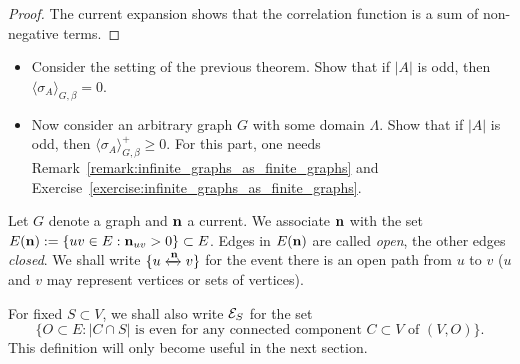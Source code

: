 \begin{proof}
    The current expansion shows that the correlation function is a sum of
    non-negative terms.
\end{proof}

\begin{exercise}
    \begin{itemize}
        \item     Consider the setting of the previous theorem.
        Show that if $|A|$ is odd, then $\langle\sigma_A\rangle_{G,\beta}=0$.
        \item Now consider an arbitrary graph $G$ with some domain $\Lambda$.
        Show that if $|A|$ is odd, then $\langle\sigma_A\rangle_{G,\beta}^+\geq 0$.
        For this part, one needs Remark~\ref{remark:infinite_graphs_as_finite_graphs}
        and Exercise~\ref{exercise:infinite_graphs_as_finite_graphs}.
    \end{itemize}
\end{exercise}

\begin{definition}
    Let $G$ denote a graph and $\mathbf{n}$ a current.
    We associate $\mathbf{n}$ with the set $E(\mathbf{n}):=\{uv\in E:\mathbf{n}_{uv}>0\}\subset E$.
    Edges in $E(\mathbf{n})$ are called \emph{open},
    the other edges \emph{closed}.
    We shall write $\{u\xleftrightarrow{\mathbf{n}}v\}$
    for the event there is an open path from $u$ to $v$
    ($u$ and $v$ may represent vertices or sets of vertices).

    For fixed $S\subset V$, we shall also write $\mathcal E_S$ for the set
    \[
        \{O\subset E:\text{$|C\cap S|$ is even for any connected component $C\subset V$ of $(V,O)$}\}.
    \]
    This definition will only become useful in the next section.
\end{definition}

